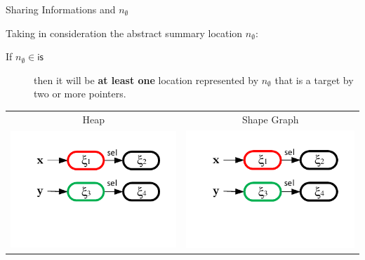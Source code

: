 \documentclass[xcolor=svgnames,11pt]{beamer}
\begin{document}
\begin{frame}{Sharing Informations and $n_\emptyset$}

Taking in consideration the abstract summary location $n_\emptyset$:

\medskip

\begin{description}
\item[If $n_\emptyset \in \mathsf{is}$] then it will be \textbf{at least one} location represented by $n_\emptyset$ that is a target by two or more pointers.
\end{description}

\medskip

\begin{tabular}{cc}
\textcolor{bl}{Heap} & \textcolor{bl}{Shape Graph} \\
\includegraphics[page=3,scale=0.65]{../figures/fig12.pdf} & \includegraphics[page=4,scale=0.65]{../figures/fig12.pdf}\\
\end{tabular}


\end{frame}
\end{document}
